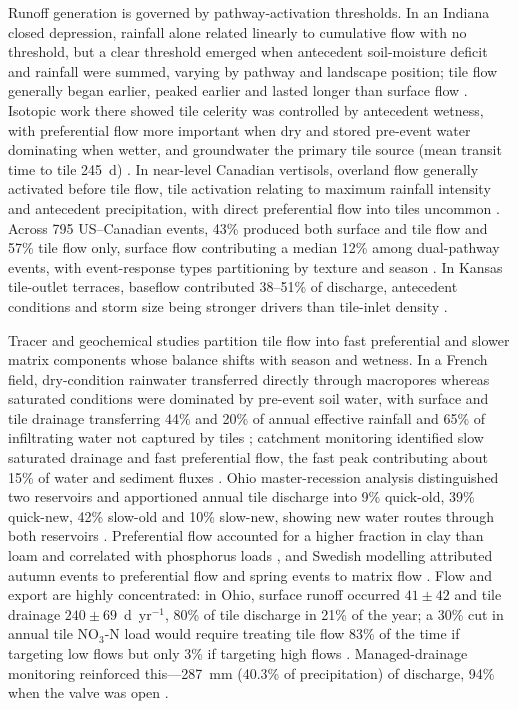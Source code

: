 \documentclass[11pt]{article}
\begin{document}
Runoff generation is governed by pathway-activation thresholds. In an Indiana closed depression, rainfall alone related linearly to cumulative flow with no threshold, but a clear threshold emerged when antecedent soil-moisture deficit and rainfall were summed, varying by pathway and landscape position; tile flow generally began earlier, peaked earlier and lasted longer than surface flow \parencite{Williams2019}. Isotopic work there showed tile celerity was controlled by antecedent wetness, with preferential flow more important when dry and stored pre-event water dominating when wetter, and groundwater the primary tile source (mean transit time to tile 245~d) \parencite{Williams2021}. In near-level Canadian vertisols, overland flow generally activated before tile flow, tile activation relating to maximum rainfall intensity and antecedent precipitation, with direct preferential flow into tiles uncommon \parencite{Kokulan2019}. Across 795 US--Canadian events, 43\% produced both surface and tile flow and 57\% tile flow only, surface flow contributing a median 12\% among dual-pathway events, with event-response types partitioning by texture and season \parencite{Macrae2019}. In Kansas tile-outlet terraces, baseflow contributed 38--51\% of discharge, antecedent conditions and storm size being stronger drivers than tile-inlet density \parencite{Stops2022}.

Tracer and geochemical studies partition tile flow into fast preferential and slower matrix components whose balance shifts with season and wetness. In a French field, dry-condition rainwater transferred directly through macropores whereas saturated conditions were dominated by pre-event soil water, with surface and tile drainage transferring 44\% and 20\% of annual effective rainfall and 65\% of infiltrating water not captured by tiles \parencite{Gaillot2023}; catchment monitoring identified slow saturated drainage and fast preferential flow, the fast peak contributing about 15\% of water and sediment fluxes \parencite{Grangeon2021}. Ohio master-recession analysis distinguished two reservoirs and apportioned annual tile discharge into 9\% quick-old, 39\% quick-new, 42\% slow-old and 10\% slow-new, showing new water routes through both reservoirs \parencite{Nazari2021}. Preferential flow accounted for a higher fraction in clay than loam and correlated with phosphorus loads \parencite{Pluer2020}, and Swedish modelling attributed autumn events to preferential flow and spring events to matrix flow \parencite{Salazar2011}. Flow and export are highly concentrated: in Ohio, surface runoff occurred $41\pm42$ and tile drainage $240\pm69$~d~yr$^{-1}$, 80\% of tile discharge in 21\% of the year; a 30\% cut in annual tile NO$_3$-N load would require treating tile flow 83\% of the time if targeting low flows but only 3\% if targeting high flows \parencite{Williams2018}. Managed-drainage monitoring reinforced this---287~mm (40.3\% of precipitation) of discharge, 94\% when the valve was open \parencite{Miller2022}.
\end{document}
